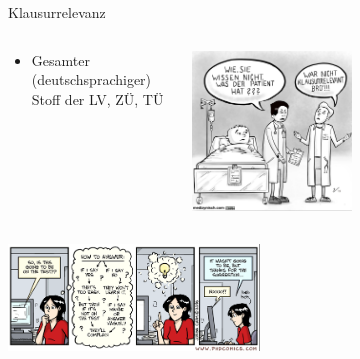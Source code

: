 \documentclass[
  german,            %
  aspectratio=169,    %
]{tumbeamer}
\begin{document}
\begin{frame}[c]{Klausurrelevanz}{}
	\begin{columns}[c]
		\begin{column}{0.5\textwidth}
			\begin{itemize}
				\item Gesamter (deutschsprachiger) Stoff der LV, ZÜ, TÜ
			\end{itemize}
		\end{column}
		\begin{column}{0.5\textwidth}
			\centering
			\includegraphics[width=0.5\textwidth]{w14_klausurrelevanz_1_vl.png}
		\end{column}
	\end{columns}
	\centering
	\includegraphics[width=0.5\textwidth]{w14_klausurrelevanz_2_vl.png}
\end{frame}
\end{document}
